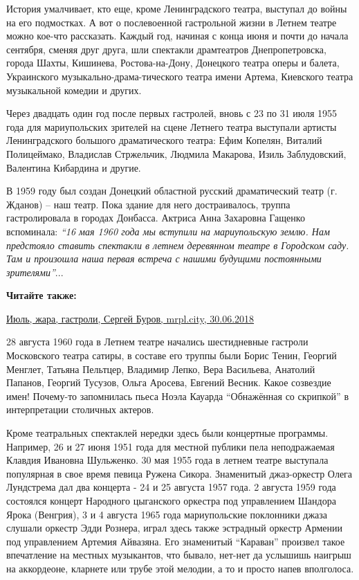 История умалчивает, кто еще, кроме Ленинградского театра, выступал до войны на
его подмостках. А вот о послевоенной гастрольной жизни в Летнем театре можно
кое-что рассказать. Каждый год, начиная с конца июня и почти до начала
сентября, сменяя друг друга, шли спектакли драмтеатров Днепропетровска, города
Шахты, Кишинева, Ростова-на-Дону, Донецкого театра оперы и балета, Украинского
музыкально-драма\hyp{}тического театра имени Артема, Киевского театра музыкальной
комедии и других.

Через двадцать один год после первых гастролей, вновь с 23 по 31 июля 1955 года
для мариупольских зрителей на сцене Летнего театра выступали артисты
Ленинградского большого драматического театра: Ефим Копелян, Виталий
Полицеймако, Владислав Стржельчик, Людмила Макарова, Изиль Заблудовский,
Валентина Кибардина и другие.

В 1959 году был создан Донецкий областной русский драматический театр (г.
Жданов) – наш театр. Пока здание для него достраивалось, труппа гастролировала
в городах Донбасса. Актриса Анна Захаровна Гащенко вспоминала: \emph{\enquote{16 мая 1960
года мы вступили на мариупольскую землю. Нам предстояло ставить спектакли в
летнем деревянном театре в Городском саду. Там и произошла наша первая встреча
с нашими будущими постоянными зрителями}}...

\textbf{Читайте также:} 

\href{https://archive.org/details/30_06_2018.sergij_burov.mrpl_city.ijul_zhara_gastroli}{%
Июль, жара, гастроли, Сергей Буров, mrpl.city, 30.06.2018}

28 августа 1960 года в Летнем театре начались шестидневные гастроли Московского
театра сатиры, в составе его труппы были Борис Тенин, Георгий Менглет, Татьяна
Пельтцер, Владимир Лепко, Вера Васильева, Анатолий Папанов, Георгий Тусузов,
Ольга Аросева, Евгений Весник. Какое созвездие имен! Почему-то запомнилась
пьеса Ноэла Кауарда \enquote{Обнажённая со скрипкой} в интерпретации столичных актеров.

Кроме театральных спектаклей нередки здесь были концертные программы. Например,
26 и 27 июня 1951 года для местной публики пела неподражаемая Клавдия Ивановна
Шульженко. 30 мая 1955 года в летнем театре выступала популярная в свое время
певица Ружена Сикора. Знаменитый джаз-оркестр Олега Лундстрема дал два концерта
- 24 и 25 августа 1957 года. 2 августа 1959 года состоялся концерт Народного
цыганского оркестра под управлением Шандора Ярока (Венгрия), 3 и 4 августа 1965
года мариупольские поклонники джаза слушали оркестр Эдди Рознера, играл здесь
также эстрадный оркестр Армении под управлением Артемия Айвазяна. Его
знаменитый \enquote{Караван} произвел такое впечатление на местных музыкантов, что
бывало, нет-нет да услышишь наигрыш на аккордеоне, кларнете или трубе этой
мелодии, а то и просто напев вполголоса.

